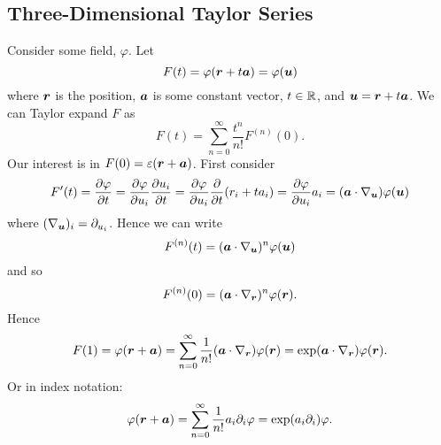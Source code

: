 \documentclass[a4paper]{article}
\begin{document}
    \subsection{Three-Dimensional Taylor Series}
    Consider some field, \(\varphi\).
    Let
    \[F(t) = \varphi(\bm{r} + t\bm{a}) = \varphi(\bm{u})\]
    where \(\bm{r}\) is the position, \(\bm{a}\) is some constant vector, \(t\in\mathbb{R}\), and \(\bm{u} = \bm{r} + t\bm{a}\).
    We can Taylor expand \(F\) as
    \[F(t) = \sum_{n=0}^{\infty}\frac{t^n}{n!}F^{(n)}(0).\]
    Our interest is in \(F(0) = \varepsilon(\bm{r} + \bm{a})\).
    First consider
    \[F'(t) = \pdv{\varphi}{t} = \pdv{\varphi}{u_i}\pdv{u_i}{t} = \pdv{\varphi}{u_i}\pdv{t}(r_i + ta_i) = \pdv{\varphi}{u_i}a_i = (\bm{a}\cdot\nabla_{\bm{u}})\varphi(\bm{u})\]
    where \((\nabla_{\bm{u}})_i = \partial_{u_i}\).
    Hence we can write
    \[F^{(n)}(t) = (\bm{a}\cdot\nabla_{\bm{u}})^n\varphi(\bm{u})\]
    and so
    \[F^{(n)}(0) = (\bm{a}\cdot\nabla_{\bm{r}})^n\varphi(\bm{r}).\]
    Hence
    \[F(1) = \varphi(\bm{r} + \bm{a}) = \sum_{n=0}^{\infty}\frac{1}{n!}(\bm{a}\cdot\nabla_{\bm{r}})\varphi(\bm{r}) = \exp(\bm{a}\cdot\nabla_{\bm{r}})\varphi(\bm{r}).\]
    Or in index notation:
    \[\varphi(\bm{r} + \bm{a}) = \sum_{n=0}^{\infty}\frac{1}{n!} a_i\partial_i\varphi = \exp(a_i\partial_i)\varphi.\]
    
\end{document}
